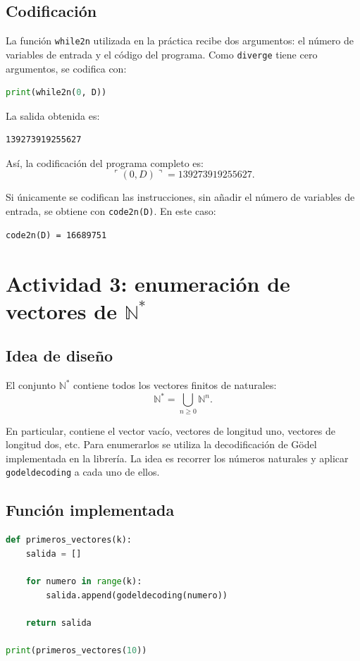 \documentclass[11pt,a4paper]{article}
\begin{document}
\subsection{Codificación}
La función \texttt{while2n} utilizada en la práctica recibe dos argumentos: el número de variables de entrada y el código del programa. Como \texttt{diverge} tiene cero argumentos, se codifica con:

\begin{lstlisting}[language=Python]
print(while2n(0, D))
\end{lstlisting}

La salida obtenida es:

\begin{lstlisting}
139273919255627
\end{lstlisting}

Así, la codificación del programa completo es:
\[
\ulcorner (0,D) \urcorner = 139273919255627.
\]

Si únicamente se codifican las instrucciones, sin añadir el número de variables de entrada, se obtiene con \texttt{code2n(D)}. En este caso:

\begin{lstlisting}
code2n(D) = 16689751
\end{lstlisting}

\section{Actividad 3: enumeración de vectores de $\mathbb{N}^{*}$}

\subsection{Idea de diseño}
El conjunto $\mathbb{N}^{*}$ contiene todos los vectores finitos de naturales:
\[
\mathbb{N}^{*}=\bigcup_{n\geq 0}\mathbb{N}^{n}.
\]

En particular, contiene el vector vacío, vectores de longitud uno, vectores de longitud dos, etc. Para enumerarlos se utiliza la decodificación de Gödel implementada en la librería. La idea es recorrer los números naturales y aplicar \texttt{godeldecoding} a cada uno de ellos.

\subsection{Función implementada}
\begin{lstlisting}[language=Python]
def primeros_vectores(k):
    salida = []

    for numero in range(k):
        salida.append(godeldecoding(numero))

    return salida

print(primeros_vectores(10))
\end{lstlisting}
\end{document}

